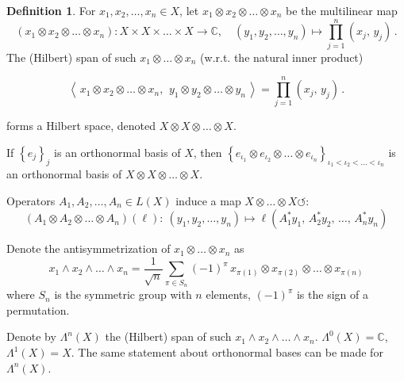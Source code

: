 \documentclass[a4paper, 10pt]{article}
\newcommand{\bbC}{\mathbb{C}}
\theoremstyle{definition}
\newtheorem{definition}{Definition}[section]
\theoremstyle{remark}
\theoremstyle{remark}
\begin{document}
\begin{definition}
    For $x_1, x_2, \ldots, x_n \in X$, let $x_1 \otimes x_2 \otimes \ldots \otimes x_n$ be the multilinear map 
    \begin{equation}
        (x_1 \otimes x_2 \otimes \ldots \otimes x_n) : X \times X \times \ldots \times X \to \bbC, \quad (y_1, y_2, \ldots, y_n) \mapsto \prod_{j=1}^{n} (x_j,\, y_j) \,. 
    \end{equation}
    The (Hilbert) span of such $x_1 \otimes \ldots \otimes x_n$ (w.r.t. the natural inner product) 

    \begin{equation}
        \left\langle\, x_1 \otimes x_2 \otimes \ldots \otimes x_n,\,\ y_1 \otimes y_2 \otimes \ldots \otimes y_n \,\right\rangle = \prod_{j=1}^{n} (x_j,\, y_j) \,. 
    \end{equation}
    
    forms a Hilbert space, denoted $X \otimes X \otimes \ldots \otimes X$. 

    If $\left\{ e_j \right\}_j$ is an orthonormal basis of $X$, then $\left\{ e_{\iota_1} \otimes e_{\iota_2} \otimes \ldots \otimes e_{\iota_n} \right\}_{\iota_1 < \iota_2 < \ldots < \iota_n}$ is an orthonormal basis of $X \otimes X \otimes \ldots \otimes X$. 

    Operators $A_1, A_2, \ldots, A_n \in L(X)$ induce a map $X \otimes \ldots \otimes X \circlearrowleft$: 
    \begin{equation}
        (A_1 \otimes A_2 \otimes \ldots \otimes A_n)(\ell) :\  (y_1, y_2, \ldots, y_n) \mapsto \ell (A_1^* y_1,\, A_2^* y_2,\, \ldots,\, A_n^* y_n)
    \end{equation}

    Denote the antisymmetrization of $x_1 \otimes \ldots \otimes x_n$ as 
    \begin{equation}
        x_1 \wedge x_2 \wedge \ldots \wedge x_n = \frac{1}{\sqrt{n}}  \sum_{\pi \in S_n} (-1)^\pi\, x_{\pi (1)} \otimes x_{\pi (2)} \otimes \ldots \otimes x_{\pi (n)} 
    \end{equation}
    where $S_n$ is the symmetric group with $n$ elements, $(-1)^\pi$ is the sign of a permutation. 

    Denote by $\Lambda^n (X)$ the (Hilbert) span of such $x_1 \wedge x_2 \wedge \ldots \wedge x_n$. $\Lambda^0 (X) = \bbC$, $\Lambda^1 (X) = X$. The same statement about orthonormal bases can be made for $\Lambda^n (X)$. 
\end{definition}
\end{document}
